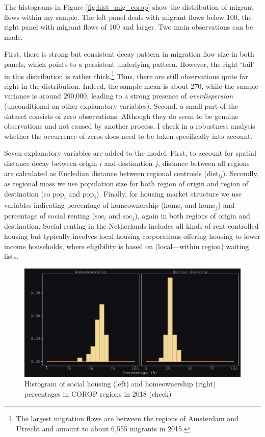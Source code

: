 \documentclass[fleqn,10pt]{SelfArx} %
\begin{document}
The histograms in Figure \ref{fig:hist_mig_corop} show the distribution of
migrant flows within my sample. The left panel deals with migrant flows below
100, the right panel with migrant flows of 100 and larger. Two main observations
can be made.

First, there is strong but consistent decay pattern in migration flow size in
both panels, which points to a persistent underlying pattern. However, the right
`tail' in this distribution is rather thick.\footnote{The largest migration
  flows are between the regions of Amsterdam and Utrecht and amount to about
  6,555 migrants in 2015.} Thus, there are still observations quite far right in
the distribution. Indeed, the sample mean is about 270, while the sample
variance is around 290,000, leading to a strong presence of
\emph{overdispersion} (unconditional on other explanatory variables). Second, a
small part of the dataset consists of zero observations. Although they do seem
to be genuine observations and not caused by another process, I check in a
robustness analysis whether the occurrence of zeros does need to be taken
specifically into account.

Seven explanatory variables are added to the model. First, to account for
spatial distance decay between origin $i$ and destination $j$, distance between
all regions are calculated as Eucledian distance between regional centroids
($\text{dist}_{ij}$). Secondly, as regional mass we use population size for
both region of origin and region of destination (so $\text{pop}_i$ and
$\text{pop}_j$). Finally, for housing market structure we use variables
indicating percentage of homeownership ($\text{home}_i$ and $\text{home}_j$) and
percentage of social renting ($\text{soc}_i$ and $\text{soc}_j$), again in both
regions of origin and destination. Social renting in the Netherlands includes all
kinds of rent controlled housing but typically involves local housing
corporations offering housing to lower income households, where eligibility is
based on (local---within region) waiting lists.

\begin{figure}[ht]\centering %
  \includegraphics[width=0.8\linewidth]{./../../fig/hist_housing_corop.pdf}
  \caption{Histogram of social housing (left) and homeownership (right)
    percentages in COROP regions in 2018 (check)}
  \label{fig:housing_mig}
\end{figure}
\end{document}
